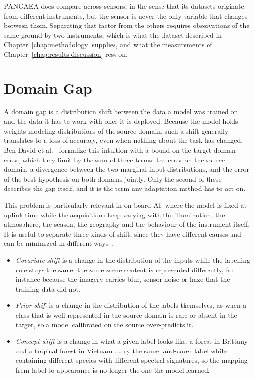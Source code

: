 PANGAEA does compare across sensors, in the sense that its datasets originate from different instruments, but the sensor is never the only variable that changes between them.
Separating that factor from the others requires observations of the same ground by two instruments, which is what the dataset described in Chapter~\ref{chap:methodology} supplies, and what the measurements of Chapter~\ref{chap:results-discussion} rest on.

\section{Domain Gap}
\label{sec:domain-gap}

A domain gap is a distribution shift between the data a model was trained on and the data it has to work with once it is deployed.
Because the model holds weights modeling distributions of the source domain, such a shift generally translates to a loss of accuracy, even when nothing about the task has changed.
Ben-David et al.~\cite{bendavid2010theory} formalize this intuition with a bound on the target-domain error, which they limit by the sum of three terms: the error on the source domain, a divergence between the two marginal input distributions, and the error of the best hypothesis on both domains jointly.
Only the second of these describes the gap itself, and it is the term any adaptation method has to act on.

This problem is particularly relevant in on-board AI, where the model is fixed at uplink time while the acquisitions keep varying with the illumination, the atmosphere, the season, the geography and the behaviour of the instrument itself.
It is useful to separate three kinds of shift, since they have different causes and can be minimized in different ways~\cite{kouw2019introductiondomainadaptationtransfer}.

\begin{itemize}
    \item[--] \emph{Covariate shift} is a change in the distribution of the inputs while the labelling rule stays the same: the same scene content is represented differently, for instance because the imagery carries blur, sensor noise or haze that the training data did not.
    \item[--] \emph{Prior shift} is a change in the distribution of the labels themselves, as when a class that is well represented in the source domain is rare or absent in the target, so a model calibrated on the source over-predicts it.
    \item[--] \emph{Concept shift} is a change in what a given label looks like: a forest in Brittany and a tropical forest in Vietnam carry the same land-cover label while containing different species with different spectral signatures, so the mapping from label to appearance is no longer the one the model learned.
\end{itemize}

